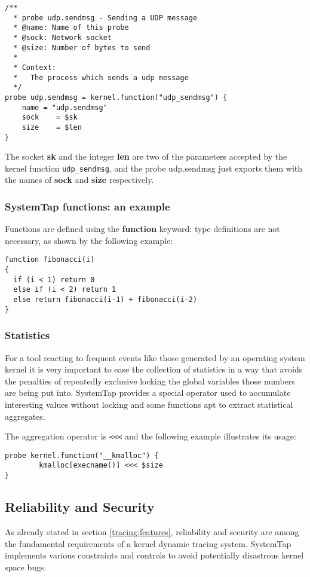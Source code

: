 \documentclass[11pt]{article}
\begin{document}
\begin{lstlisting}
/**
  * probe udp.sendmsg - Sending a UDP message  
  * @name: Name of this probe
  * @sock: Network socket 
  * @size: Number of bytes to send  
  *
  * Context:
  *   The process which sends a udp message 
  */
probe udp.sendmsg = kernel.function("udp_sendmsg") {
    name = "udp.sendmsg"
    sock    = $sk
    size    = $len
}
\end{lstlisting}

The socket \textbf{sk} and the integer \textbf{len} are two of the parameters
accepted by the kernel function \verb|udp_sendmsg|, and the probe udp.sendmsg
just exports them with the names of \textbf{sock} and \textbf{size}
respectively.

\subsubsection{SystemTap functions: an example}
Functions are defined using the \textbf{function} keyword: type definitions are
not necessary, as shown by the following example:

\begin{lstlisting}
function fibonacci(i)
{
  if (i < 1) return 0
  else if (i < 2) return 1
  else return fibonacci(i-1) + fibonacci(i-2)
}
\end{lstlisting}

\subsubsection{Statistics}
For a tool reacting to frequent events like those generated by an operating
system kernel it is very important to ease the collection of statistics in a
way that avoids the penalties of repeatedly exclusive locking the global
variables those numbers are being put into.  SystemTap provides a special
operator used to accumulate interesting values without locking and some
functions apt to extract statistical aggregates\cite{manstap}.

\pagebreak

The aggregation operator is \verb|<<<| and the following example illustrates
its usage:

\begin{lstlisting}
probe kernel.function("__kmalloc") { 
        kmalloc[execname()] <<< $size
}
\end{lstlisting}

\subsection{Reliability and Security}
\label{systemtap:security}
As already stated in section \ref{tracing:features}, reliability and security
are among the fundamental requirements of a kernel dynamic tracing system.
SystemTap implements various constraints and controls to avoid potentially
disastrous kernel space bugs.
\end{document}

